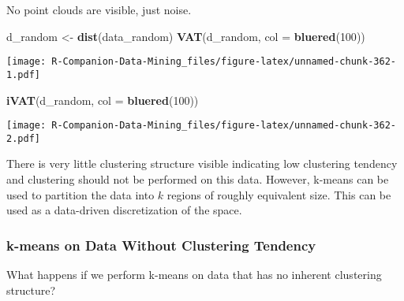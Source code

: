 \documentclass[
  notitlepage]{book}
\newenvironment{Shaded}{\begin{snugshade}}{\end{snugshade}}
\newcommand{\CommentTok}[1]{\textcolor[rgb]{0.56,0.35,0.01}{\textit{#1}}}
\newcommand{\DataTypeTok}[1]{\textcolor[rgb]{0.13,0.29,0.53}{#1}}
\newcommand{\DecValTok}[1]{\textcolor[rgb]{0.00,0.00,0.81}{#1}}
\newcommand{\KeywordTok}[1]{\textcolor[rgb]{0.13,0.29,0.53}{\textbf{#1}}}
\newcommand{\NormalTok}[1]{#1}
\newcommand{\OtherTok}[1]{\textcolor[rgb]{0.56,0.35,0.01}{#1}}
\newcommand{\StringTok}[1]{\textcolor[rgb]{0.31,0.60,0.02}{#1}}
\begin{document}
No point clouds are visible, just noise.

\begin{Shaded}
\begin{Highlighting}[]
\NormalTok{d\_random \textless{}{-}}\StringTok{ }\KeywordTok{dist}\NormalTok{(data\_random)}
\KeywordTok{VAT}\NormalTok{(d\_random, }\DataTypeTok{col =} \KeywordTok{bluered}\NormalTok{(}\DecValTok{100}\NormalTok{))}
\end{Highlighting}
\end{Shaded}

\texttt{[image: R-Companion-Data-Mining\_files/figure-latex/unnamed-chunk-362-1.pdf]}

\begin{Shaded}
\begin{Highlighting}[]
\KeywordTok{iVAT}\NormalTok{(d\_random, }\DataTypeTok{col =} \KeywordTok{bluered}\NormalTok{(}\DecValTok{100}\NormalTok{))}
\end{Highlighting}
\end{Shaded}

\texttt{[image: R-Companion-Data-Mining\_files/figure-latex/unnamed-chunk-362-2.pdf]}

\begin{Shaded}
\end{Shaded}

There is very little clustering structure visible indicating low
clustering tendency and clustering should not be performed on this data.
However, k-means can be used to partition the data into \(k\) regions of
roughly equivalent size. This can be used as a data-driven
discretization of the space.

\hypertarget{k-means-on-data-without-clustering-tendency}{%
\subsubsection{k-means on Data Without Clustering Tendency}\label{k-means-on-data-without-clustering-tendency}}

What happens if we perform k-means on data that has no inherent
clustering structure?
\end{document}
